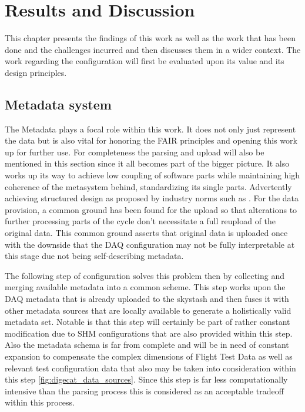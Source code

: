 \chapter{Results and Discussion}

This chapter presents the findings of this work as well as the work that has been done and the challenges incurred and then discusses them in a wider context. The work regarding the configuration will first be evaluated upon its value and its design principles.








\section{Metadata system}

The Metadata plays a focal role within this work. It does not only just represent the data but is also vital for honoring the FAIR principles and opening this work up for further use. For completeness the parsing and upload will also be mentioned in this section since it all becomes part of the bigger picture. It also works up its way to achieve low coupling of software parts while maintaining high coherence of the metasystem behind, standardizing its single parts. Advertently achieving structured design as proposed by industry norms such as \textcite{stevens_structured_1974}.
For the data provision, a common ground has been found for the upload so that alterations to further processing parts of the cycle don't necessitate a full reupload of the original data. This common ground asserts that original data is uploaded once with the downside that the DAQ configuration may not be fully interpretable at this stage due not being self-describing metadata.

The following step of configuration solves this problem then by collecting and merging available metadata into a common scheme. This step works upon the DAQ metadata that is already uploaded to the skystash and then fuses it with other metadata sources that are locally available to generate a holistically valid metadata set. Notable is that this step will certainly be part of rather constant modification due to SHM configurations that are also provided within this step. Also the metadata schema is far from complete and will be in need of constant expansion to compensate the complex dimensions of Flight Test Data as well as relevant test configuration data that also may be taken into consideration within this step \ref{fig:digecat_data_sources}. Since this step is far less computationally intensive than the parsing process this is considered as an acceptable tradeoff within this process.

